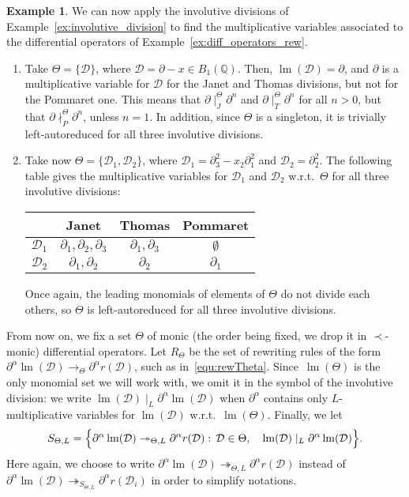 \documentclass[11pt]{article}
\theoremstyle{definition}
\newtheorem{example}[theorem]{Example}
\newcommand\wrt{w.r.t.}
\newcommand\D{\mathcal{D}}
\DeclareMathOperator{\lm}{lm}
\newcommand\Q{\mathbb{Q}}
\newcommand\Weyl[1]{B_{#1}(\Q)}
\newcommand\parTheta[1]{\twoheadrightarrow_{\Theta,#1}}
\newcommand\rewTheta{\to_\Theta}
\newcommand\divInv[1]{\mid_{#1}}
\newcommand\RTheta{R_{\Theta}}
\newcommand\SThetaL{S_{\Theta,L}}
\begin{document}
\begin{example}\label{ex:multiplicative_variables}
  We can now apply the involutive divisions of 
  Example~\ref{ex:involutive_division} to find the multiplicative
  variables associated to the differential operators of
  Example~\ref{ex:diff_operators_rew}.
  \begin{enumerate}
  \item Take $\Theta = \{\D\}$, where $\D = \partial - x \in \Weyl 1$.
    Then, $\lm(\D) =\partial$, and $\partial$ is a multiplicative
    variable for $\D$ for the Janet and Thomas divisions, but not for the
    Pommaret one. This means that $\partial \divInv{J}^\Theta \partial^n$
    and $\partial \divInv{T}^\Theta \partial^n$ for all $n > 0$, but that
    $\partial \nmid_P^\Theta \partial^n$, unless $n = 1$. In addition,
    since $\Theta$ is a singleton, it is trivially left-autoreduced for
    all three involutive divisions. 
  \item Take now $\Theta = \{\D_1,\D_2\}$, where
    $\D_1=\partial_3^2 - x_2\partial_1^2$ and $\D_2 = \partial_2^2$. The
    following table gives the multiplicative variables for $\D_1$ and
    $\D_2$ \wrt\ $\Theta$ for all three involutive divisions:
    \begin{center}
    \begin{tabular}{l|ccc}
      & Janet & Thomas & Pommaret \\ \hline
      $\D_1$ & $\partial_1, \partial_2, \partial_3$ & $\partial_1, \partial_3$ & $\emptyset$ \\
      $\D_2$ & $\partial_1, \partial_2$ & $\partial_2$ & $\partial_1$ \\
    \end{tabular}
  \end{center}
    Once again, the leading monomials of elements of $\Theta$ do not divide
    each others, so $\Theta$ is left-autoreduced for all three involutive
    divisions.
  \end{enumerate}
\end{example}
\smallskip


From now on, we fix a set $\Theta$ of monic (the order being fixed, we
drop it in $\prec$-monic) differential operators. Let $\RTheta$  be the
set of rewriting rules of the form
$\partial^\alpha\lm(\D)\rewTheta\partial^\alpha r(\D)$, such as
in~\eqref{equ:rewTheta}. Since~$\lm(\Theta)$ is the only monomial set we
will work with, we omit it in the symbol of the involutive division: we
write $\lm(\D)\divInv{L}\partial^\alpha\lm(\D)$ when $\partial^\alpha$
contains only $L$-multiplicative variables for $\lm(\D)$ \wrt\
$\lm(\Theta)$. Finally, we let
\begin{equation}\label{equ:S-strategy}
  \SThetaL=\Big\{\partial^\alpha\lm(\D)\parTheta{L}\partial^\alpha
  r(\D) : \, \D\in\Theta,\quad\lm(\D)\divInv{L}\partial^\alpha\lm(\D)
  \Big\}.
  \smallskip
\end{equation}
Here again, we choose to write
$\partial^\alpha\lm(\D)\parTheta{L}\partial^\alpha r(\D)$ instead of
$\partial^\alpha\lm(\D)\twoheadrightarrow_{\SThetaL}\partial^\alpha
r(\D_i)$ in order to simplify notations.
\smallskip
\end{document}
